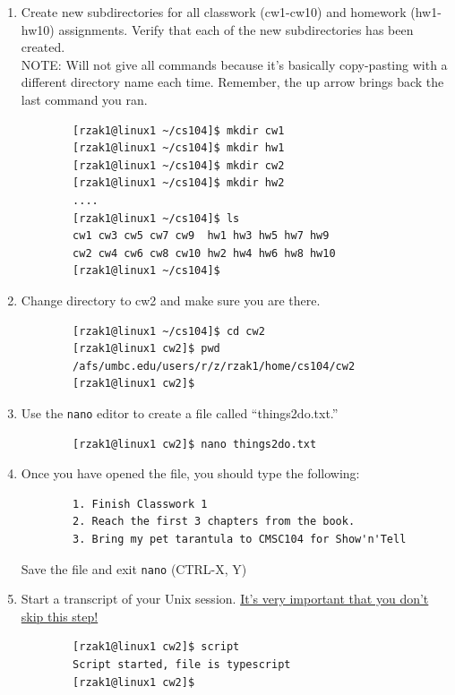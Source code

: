 \documentclass[letter,11pt]{article}
\begin{document}
\begin{enumerate}
    \begin{verbatim}
        [rzak1@linux1 ~]$ cd cs104
        [rzak1@linux1 ~/cs104]$ pwd
        /afs/umbc.edu/users/r/z/rzak1/home/cs104
        [rzak1@linux1 ~/cs104]$    
    \end{verbatim}
    \item Create new subdirectories for all classwork (cw1-cw10) and homework (hw1-hw10) assignments. Verify that each of the new subdirectories has been created. \\ NOTE: Will not give all commands because it’s basically copy-pasting with a different directory name each time. Remember, the up arrow brings back the last command you ran.
    \begin{verbatim}
        [rzak1@linux1 ~/cs104]$ mkdir cw1
        [rzak1@linux1 ~/cs104]$ mkdir hw1
        [rzak1@linux1 ~/cs104]$ mkdir cw2
        [rzak1@linux1 ~/cs104]$ mkdir hw2
        ....
        [rzak1@linux1 ~/cs104]$ ls
        cw1 cw3 cw5 cw7 cw9  hw1 hw3 hw5 hw7 hw9
        cw2 cw4 cw6 cw8 cw10 hw2 hw4 hw6 hw8 hw10
        [rzak1@linux1 ~/cs104]$ 
    \end{verbatim}
    \item Change directory to cw2 and make sure you are there.
    \begin{verbatim}
        [rzak1@linux1 ~/cs104]$ cd cw2
        [rzak1@linux1 cw2]$ pwd
        /afs/umbc.edu/users/r/z/rzak1/home/cs104/cw2
        [rzak1@linux1 cw2]$ 
    \end{verbatim}
    \item Use the \texttt{nano} editor to create a file called ``things2do.txt.''
    \begin{verbatim}
        [rzak1@linux1 cw2]$ nano things2do.txt
    \end{verbatim}
    \item Once you have opened the file, you should type the following:
    \begin{verbatim}
        1. Finish Classwork 1
        2. Reach the first 3 chapters from the book.
        3. Bring my pet tarantula to CMSC104 for Show'n'Tell
    \end{verbatim}
    Save the file and exit \texttt{nano} (CTRL-X, Y)
    \item Start a transcript of your Unix session. \underline{It's very important that you don't skip this step!}
    \begin{verbatim}
        [rzak1@linux1 cw2]$ script
        Script started, file is typescript
        [rzak1@linux1 cw2]$ 
    \end{verbatim}

\end{enumerate}
\end{document}
